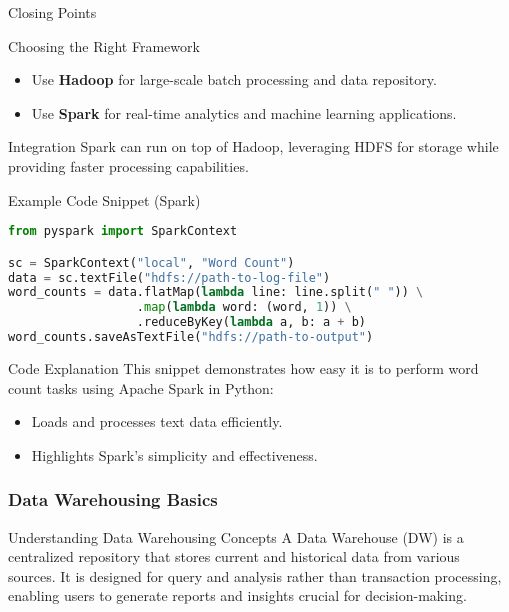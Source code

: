 \documentclass[aspectratio=169]{beamer}
\begin{document}
\begin{frame}{Closing Points}
    \begin{block}{Choosing the Right Framework}
        \begin{itemize}
            \item Use \textbf{Hadoop} for large-scale batch processing and data repository.
            \item Use \textbf{Spark} for real-time analytics and machine learning applications.
        \end{itemize}
    \end{block}
    \begin{block}{Integration}
        Spark can run on top of Hadoop, leveraging HDFS for storage while providing faster processing capabilities.
    \end{block}
\end{frame}

\begin{frame}[fragile]{Example Code Snippet (Spark)}
    \begin{lstlisting}[language=Python]
from pyspark import SparkContext

sc = SparkContext("local", "Word Count")
data = sc.textFile("hdfs://path-to-log-file")
word_counts = data.flatMap(lambda line: line.split(" ")) \
                  .map(lambda word: (word, 1)) \
                  .reduceByKey(lambda a, b: a + b)
word_counts.saveAsTextFile("hdfs://path-to-output")
    \end{lstlisting}
    \begin{block}{Code Explanation}
        This snippet demonstrates how easy it is to perform word count tasks using Apache Spark in Python:
        \begin{itemize}
            \item Loads and processes text data efficiently.
            \item Highlights Spark's simplicity and effectiveness.
        \end{itemize}
    \end{block}
\end{frame}

\begin{frame}[fragile]
    \frametitle{Data Warehousing Basics}
    \begin{block}{Understanding Data Warehousing Concepts}
        A Data Warehouse (DW) is a centralized repository that stores current and historical data from various sources. It is designed for query and analysis rather than transaction processing, enabling users to generate reports and insights crucial for decision-making.
    \end{block}
\end{frame}
\end{document}
